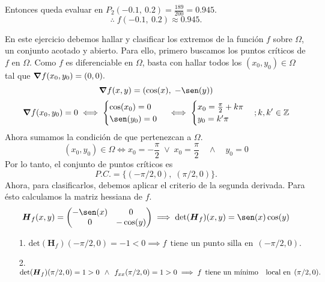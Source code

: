 \begin{solution}
    Entonces queda evaluar en $P_2\left(-0\text{.}1,\:0\text{.}2\right) = \frac{189}{200} = 0\text{.}945$.
    $$\therefore\;f\left(-0\text{.}1,\:0\text{.}2\right)\approx0\text{.}945.$$
\end{solution}

\begin{solution}
    En este ejercicio debemos hallar y clasificar los extremos de la función $f$ sobre $\Omega$,  un conjunto acotado y abierto.
    Para ello,    primero buscamos los puntos críticos de $f$ en $\Omega$. Como $f$ es diferenciable en  $\Omega$, basta con hallar todos los $(x_0,y_0) \in  \Omega$ tal que $\grad f(x_0,y_0)=(0,0).$
    \[
        \grad f(x,y)=\left(\cos(x),\;-\sen(y)\right)
    \]
    \[
        \grad f(x_0,y_0) =0 \iff \begin{cases}
            \cos(x_0)=0 \\ \sen(y_0)=0
        \end{cases} \iff \begin{cases}
            x_0 = \frac{\pi}{2}+k\pi \\
            y_0 = k'\pi
        \end{cases};k,k'\in\mathbb{Z}
    \]
    Ahora sumamos la condición de que pertenezcan a $\Omega$.
    \[
        (x_0,y_0)\in\Omega\iff x_0=-\frac{\pi}{2}\;\lor\;x_0=\frac{\pi}{2}\quad\land\quad y_0=0
    \]
    Por lo tanto,  el conjunto de puntos críticos es
    \[
        P.C.=\{(-\pi/2,0),\;(\pi/2,0)\}.
    \]
    Ahora, para clasificarlos, debemos aplicar el criterio de la segunda derivada. Para ésto calculamos la matriz hessiana de $f$.
    \[
        \boldsymbol{H}_f(x,y)=\left(\begin{matrix}
                -\sen(x) & 0 \\ 0 & -\cos(y)
            \end{matrix}\right)\implies \text{det}(\boldsymbol{H}_f)(x,y)=\sen(x)\cos(y)
    \]

    \begin{itemize}
        \item[1.] $\text{det}(\boldsymbol{H}_f)(-\pi/2,0)=-1<0 \implies f\:\:\text{tiene un punto silla en}\:\: (-\pi/2,0).$
        \item[2.] $\text{det}(\boldsymbol{H}_f)(\pi/2,0)=1>0 \:\:\land\:\: f_{xx}(\pi/2,0)=1>0\implies f\:\:\text{tiene un mínimo} \\
                  \quad \text{local en}\:\:(\pi/2,0).$
    \end{itemize}
\end{solution}
